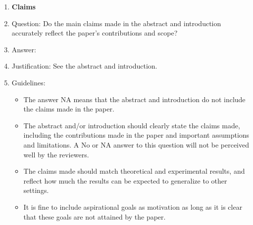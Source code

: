 \documentclass{article}
\theoremstyle{plain}
\theoremstyle{definition}
\theoremstyle{remark}
\begin{document}


\begin{enumerate}

\item {\bf Claims}
    \item[] Question: Do the main claims made in the abstract and introduction accurately reflect the paper's contributions and scope?
    \item[] Answer: \answerYes{} %
    \item[] Justification: See the abstract and introduction.
    \item[] Guidelines:
    \begin{itemize}
        \item The answer NA means that the abstract and introduction do not include the claims made in the paper.
        \item The abstract and/or introduction should clearly state the claims made, including the contributions made in the paper and important assumptions and limitations. A No or NA answer to this question will not be perceived well by the reviewers. 
        \item The claims made should match theoretical and experimental results, and reflect how much the results can be expected to generalize to other settings. 
        \item It is fine to include aspirational goals as motivation as long as it is clear that these goals are not attained by the paper. 
    \end{itemize}


\end{enumerate}
\end{document}
